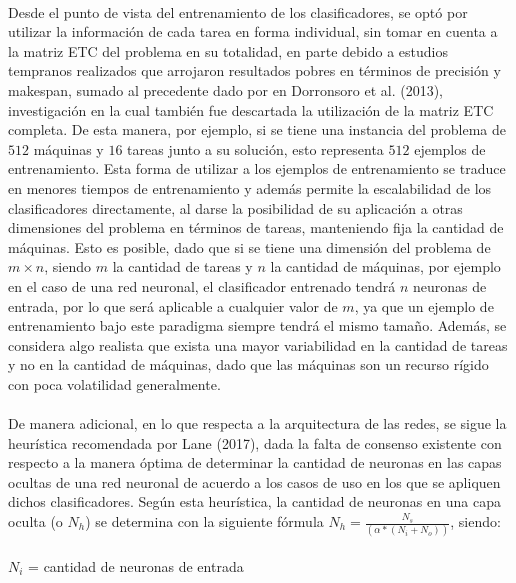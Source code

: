 \paragraph{} Desde el punto de vista del entrenamiento de los clasificadores, se optó por utilizar la información de cada tarea en forma individual, sin tomar en cuenta a la matriz ETC del problema en su totalidad, en parte debido a estudios tempranos realizados que arrojaron resultados pobres en términos de precisión y makespan, sumado al precedente dado por en Dorronsoro et al. (2013), investigación en la cual también fue descartada la utilización de la matriz ETC completa. De esta manera, por ejemplo, si se tiene una instancia del problema de $512$ máquinas y $16$ tareas junto a su solución, esto representa $512$ ejemplos de entrenamiento. Esta forma de utilizar a los ejemplos de entrenamiento se traduce en menores tiempos de entrenamiento y además permite la escalabilidad de los clasificadores directamente, al darse la posibilidad de su aplicación a otras dimensiones del problema en términos de tareas, manteniendo fija la cantidad de máquinas.  Esto es posible, dado que si se tiene una dimensión del problema de $m \times n$, siendo $m$ la cantidad de tareas y $n$ la cantidad de máquinas, por ejemplo en el caso de una red neuronal, el clasificador entrenado tendrá $n$ neuronas de entrada, por lo que será aplicable a cualquier valor de $m$, ya que un ejemplo de entrenamiento bajo este paradigma siempre tendrá el mismo tamaño. Además, se considera algo realista que exista una mayor variabilidad en la cantidad de tareas y no en la cantidad de máquinas, dado que las máquinas son un recurso rígido con poca volatilidad generalmente.

\paragraph{} De manera adicional, en lo que respecta a la arquitectura de las redes, se sigue la heurística recomendada por Lane (2017), dada la falta de consenso existente con respecto a la manera óptima de determinar la cantidad de neuronas en las capas ocultas de una red neuronal de acuerdo a los casos de uso en los que se apliquen dichos clasificadores. Según esta heurística, la cantidad de neuronas en una capa oculta (o $N_h$) se determina con la siguiente fórmula $N_h = \frac{N_s} {(\alpha * (N_i + N_o))}$, siendo:

\paragraph{} $N_i$ = cantidad de neuronas de entrada
